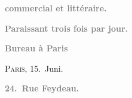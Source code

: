 \pstart
           \begin{otherlanguage}{french}\textcolor{gray}{\textbf{commercial et littéraire.}}\end{otherlanguage}\pend
           
\pstart
           \begin{otherlanguage}{french}\textcolor{gray}{\textbf{\textbf{Paraissant trois fois par jour.}}}\end{otherlanguage}\pend
           
\pstart
           \begin{otherlanguage}{french}\textcolor{gray}{\textbf{\textbf{Bureau à Paris}}}\end{otherlanguage}\hfill \textsc{Paris}, 15. Juni.\pend
           
\pstart
           \begin{otherlanguage}{french}\textcolor{gray}{\textbf{\textbf{24. Rue Feydeau.}}}\end{otherlanguage}\pend
           
